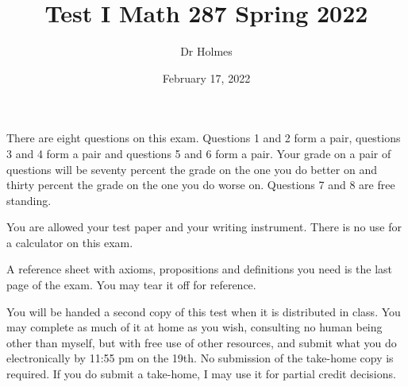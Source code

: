 \documentclass[12pt]{article}
\title{Test I Math 287 Spring 2022}
\author{Dr Holmes}
\date{February 17, 2022}
\begin{document}
\maketitle

There are eight questions on this exam.  Questions 1 and 2 form a pair, questions 3 and 4 form a pair and questions 5 and 6 form a pair.  Your grade on a pair of questions will be seventy percent the grade on the one you do better on and thirty percent the grade on the one you do worse on.  Questions 7 and 8 are free standing.

You are allowed your test paper and your writing instrument.  There is no use for a calculator on this exam.

A reference sheet with axioms, propositions and definitions you need is the last page of the exam.  You may tear it off for reference.

You will be handed a second copy of this test when it is distributed in class.  You may complete as much of it at home as you wish, consulting no human being other than myself, but with free use of other resources, and submit what you do electronically by 11:55 pm on the 19th.  No submission of the take-home copy is required.  If you do submit a take-home, I may use it for partial credit decisions.

\newpage
\end{document}
